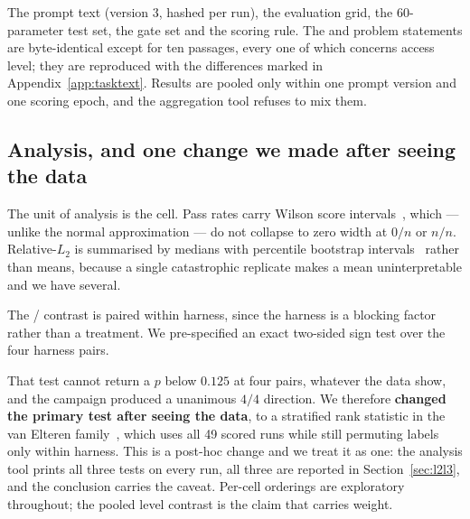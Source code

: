 The prompt text (version 3, hashed per run), the evaluation grid, the
60-parameter test set, the gate set and the scoring rule. The \Ltwo{} and
\Lthree{} problem statements are byte-identical except for ten passages, every
one of which concerns access level; they are reproduced with the differences
marked in Appendix~\ref{app:tasktext}. Results are pooled only within one prompt
version and one scoring epoch, and the aggregation tool refuses to mix them.

\subsection{Analysis, and one change we made after seeing the data}
\label{sec:analysis}

The unit of analysis is the cell. Pass rates carry Wilson score
intervals~\citep{wilson1927probable}, which --- unlike the normal
approximation --- do not collapse to zero width at $0/n$ or $n/n$.
Relative-$L_2$ is summarised by medians with percentile bootstrap
intervals~\citep{efron1979bootstrap} rather than means, because a single
catastrophic replicate makes a mean uninterpretable and we have several.

The \Ltwo{}/\Lthree{} contrast is paired within harness, since the harness is a
blocking factor rather than a treatment. We pre-specified an exact two-sided
sign test over the four harness pairs.

That test cannot return a $p$ below $0.125$ at four pairs, whatever the data
show, and the campaign produced a unanimous $4/4$ direction. We therefore
\textbf{changed the primary test after seeing the data}, to a stratified rank
statistic in the van Elteren family~\citep{vanelteren1960combination}, which
uses all 49 scored runs while still permuting labels only within harness. This
is a post-hoc change and we treat it as one: the analysis tool prints all three
tests on every run, all three are reported in Section~\ref{sec:l2l3}, and the
conclusion carries the caveat. Per-cell orderings are exploratory throughout;
the pooled level contrast is the claim that carries weight.
